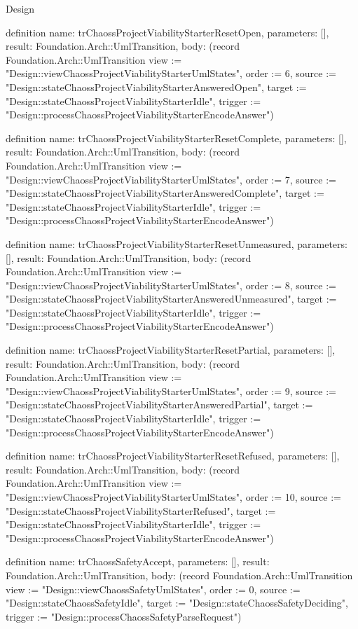 \begin{lexlean}{Design}
\begin{semanticmodule}
definition{
  name: trChaossProjectViabilityStarterResetOpen,
  parameters: [],
  result: Foundation.Arch::UmlTransition,
  body: (record Foundation.Arch::UmlTransition {view := "Design::viewChaossProjectViabilityStarterUmlStates", order := 6, source := "Design::stateChaossProjectViabilityStarterAnsweredOpen", target := "Design::stateChaossProjectViabilityStarterIdle", trigger := "Design::processChaossProjectViabilityStarterEncodeAnswer"})
}

definition{
  name: trChaossProjectViabilityStarterResetComplete,
  parameters: [],
  result: Foundation.Arch::UmlTransition,
  body: (record Foundation.Arch::UmlTransition {view := "Design::viewChaossProjectViabilityStarterUmlStates", order := 7, source := "Design::stateChaossProjectViabilityStarterAnsweredComplete", target := "Design::stateChaossProjectViabilityStarterIdle", trigger := "Design::processChaossProjectViabilityStarterEncodeAnswer"})
}

definition{
  name: trChaossProjectViabilityStarterResetUnmeasured,
  parameters: [],
  result: Foundation.Arch::UmlTransition,
  body: (record Foundation.Arch::UmlTransition {view := "Design::viewChaossProjectViabilityStarterUmlStates", order := 8, source := "Design::stateChaossProjectViabilityStarterAnsweredUnmeasured", target := "Design::stateChaossProjectViabilityStarterIdle", trigger := "Design::processChaossProjectViabilityStarterEncodeAnswer"})
}

definition{
  name: trChaossProjectViabilityStarterResetPartial,
  parameters: [],
  result: Foundation.Arch::UmlTransition,
  body: (record Foundation.Arch::UmlTransition {view := "Design::viewChaossProjectViabilityStarterUmlStates", order := 9, source := "Design::stateChaossProjectViabilityStarterAnsweredPartial", target := "Design::stateChaossProjectViabilityStarterIdle", trigger := "Design::processChaossProjectViabilityStarterEncodeAnswer"})
}

definition{
  name: trChaossProjectViabilityStarterResetRefused,
  parameters: [],
  result: Foundation.Arch::UmlTransition,
  body: (record Foundation.Arch::UmlTransition {view := "Design::viewChaossProjectViabilityStarterUmlStates", order := 10, source := "Design::stateChaossProjectViabilityStarterRefused", target := "Design::stateChaossProjectViabilityStarterIdle", trigger := "Design::processChaossProjectViabilityStarterEncodeAnswer"})
}

definition{
  name: trChaossSafetyAccept,
  parameters: [],
  result: Foundation.Arch::UmlTransition,
  body: (record Foundation.Arch::UmlTransition {view := "Design::viewChaossSafetyUmlStates", order := 0, source := "Design::stateChaossSafetyIdle", target := "Design::stateChaossSafetyDeciding", trigger := "Design::processChaossSafetyParseRequest"})
}


\end{semanticmodule}
\end{lexlean}
